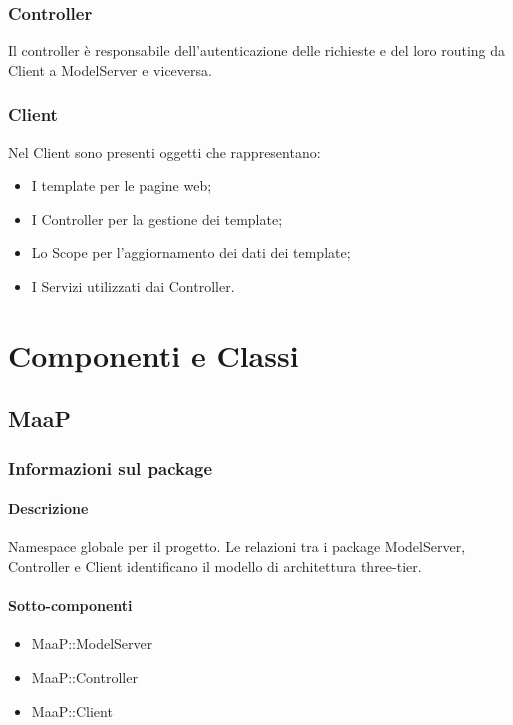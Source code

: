 \subsubsection{Controller}
Il controller è responsabile dell’autenticazione delle richieste e del loro routing da Client a ModelServer e viceversa.

\subsubsection{Client}
Nel Client sono presenti oggetti che rappresentano:
\begin{itemize}
\item I template per le pagine web;
\item I Controller per la gestione dei template;
\item Lo Scope per l'aggiornamento dei dati dei template;
\item I Servizi utilizzati dai Controller.
\end{itemize}

\newpage
\section{Componenti e Classi}

\subsection{MaaP}
\subsubsection{Informazioni sul package}
\paragraph{Descrizione}
Namespace globale per il progetto. Le relazioni tra i package ModelServer, Controller e Client identificano il modello di architettura three-tier.

\paragraph{Sotto-componenti}
\begin{itemize}
\item MaaP::ModelServer
\item MaaP::Controller
\item MaaP::Client
\end{itemize}

